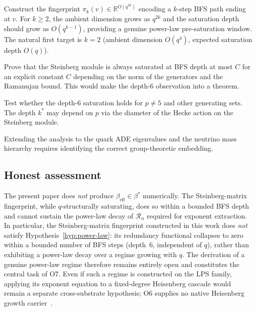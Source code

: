 \documentclass[11pt]{article}
\theoremstyle{definition}
\theoremstyle{remark}
\newcommand{\R}{\mathbb{R}}
\newcommand{\beff}{\beta_{\mathrm{eff}}}
\newcommand{\Rn}{\mathcal{R}_n}
\begin{document}
    \begin{description}[leftmargin=2em]
\item[O6-O1 (Multi-step path fingerprint).]
Construct the fingerprint $\pi_k(v) \in \R^{O(q^{2k})}$ encoding a $k$-step BFS
path ending at $v$.
For $k \geq 2$, the ambient dimension grows as $q^{2k}$ and the saturation depth
should grow as $O(q^{k-1})$, providing a genuine power-law pre-saturation window.
The natural first target is $k=2$ (ambient dimension $O(q^4)$, expected saturation
depth $O(q)$).

\item[O6-O2 (Analytic bound on the depth $k^*$).]
Prove that the Steinberg module is always saturated at BFS depth at most $C$ for
an explicit constant $C$ depending on the norm of the generators and the
Ramanujan bound.
This would make the depth-6 observation into a theorem.

\item[O6-O3 (Other LPS primes).]
Test whether the depth-6 saturation holds for $p \neq 5$ and other generating sets.
The depth $k^*$ may depend on $p$ via the diameter of the Hecke action on the
Steinberg module.

\item[O6-O4 (Quark and neutrino sectors).]
Extending the analysis to the quark ADE eigenvalues and the neutrino mass hierarchy
requires identifying the correct group-theoretic embedding.
    \end{description}

  \subsection{Honest assessment}
    \label{ssec:honest}

    The present paper does \emph{not} produce $\beff \in \beta^*$ numerically.
    The Steinberg-matrix fingerprint, while $q$-structurally saturating, does so within
    a bounded BFS depth and cannot sustain the power-law decay of $\Rn$ required for
    exponent extraction.
    In particular, the Steinberg-matrix fingerprint constructed in this work does
    \emph{not} satisfy Hypothesis~\ref{hyp:power-law}: its redundancy functional
    collapses to zero within a bounded number of BFS steps (depth~6, independent of $q$),
    rather than exhibiting a power-law decay over a regime growing with $q$.
    The derivation of a genuine power-law regime therefore remains entirely open and
    constitutes the central task of O7.
    Even if such a regime is constructed on the LPS family, applying its exponent equation to
    a fixed-degree Heisenberg cascade would remain a separate cross-substrate hypothesis; O6
    supplies no native Heisenberg growth carrier~\cite{Beau2026sgn}.
\end{document}
